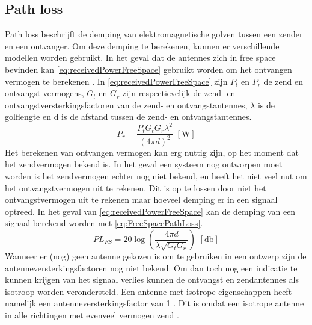 \subsection{Path loss}
Path loss beschrijft de demping van elektromagnetische golven tussen een zender en een ontvanger. Om deze demping te berekenen, kunnen er verschillende modellen worden gebruikt. In het geval dat de antennes zich in free space bevinden kan \autoref{eq:receivedPowerFreeSpace} gebruikt worden om het ontvangen vermogen te berekenen \cite[13]{bensky2019shortRangeWirelessCommunication}. In \autoref{eq:receivedPowerFreeSpace} zijn \(P_t\) en \(P_r\) de zend en ontvangst vermogens, \(G_t\) en \(G_r\) zijn respectievelijk de zend- en ontvangstversterkingsfactoren van de zend- en ontvangstantennes, \(\lambda\) is de golflengte en d is de afstand tussen de zend- en ontvangstantennes. 
\begin{equation}\label{eq:receivedPowerFreeSpace}
    P_r=\frac{P_tG_tG_r\lambda^2}{\left(4\pi d\right)^2} \,\,\left[\unit{\watt}\right]
\end{equation}
Het berekenen van ontvangen vermogen kan erg nuttig zijn, op het moment dat het zendvermogen bekend is. In het geval een systeem nog ontworpen moet worden is het zendvermogen echter nog niet bekend, en heeft het niet veel nut om het ontvangstvermogen uit te rekenen. Dit is op te lossen door niet het ontvangstvermogen uit te rekenen maar hoeveel demping er in een signaal optreed. In het geval van \autoref{eq:receivedPowerFreeSpace} kan de demping van een signaal berekend worden met \autoref{eq:FreeSpacePathLoss}.
\begin{equation}\label{eq:FreeSpacePathLoss}
    PL_{FS}=20\log\left(\frac{4\pi d}{\lambda\sqrt{G_tG_r}}\right) \,\,\left[\unit{\decibel}\right]
\end{equation}
Wanneer er (nog) geen antenne gekozen is om te gebruiken in een ontwerp zijn de antenneversterkingsfactoren nog niet bekend. Om dan toch nog een indicatie te kunnen krijgen van het signaal verlies kunnen de ontvangst en zendantennes als isotroop worden verondersteld. Een antenne met isotrope eigenschappen heeft namelijk een antenneversterkingsfactor van 1 \cite{bensky2019shortRangeWirelessCommunication}. Dit is omdat een isotrope antenne in alle richtingen met evenveel vermogen zend \cite{bensky2019shortRangeWirelessCommunication}.
